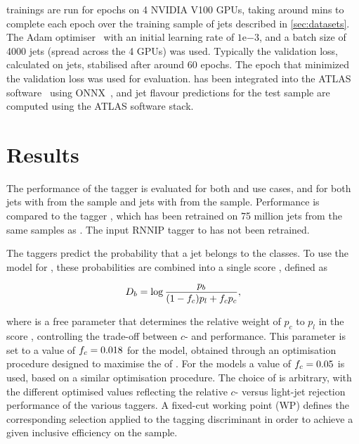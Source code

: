 \GNN trainings are run for \nepochs epochs on 4 NVIDIA V100 GPUs, taking around \minsperepoch mins to complete each epoch over the training sample of \njetstrain jets described in \cref{sec:datasets}.
The Adam optimiser~\cite{arxiv.1412.6980} with an initial learning rate of $1\mathrm{e}{-3}$, and a batch size of 4000 jets (spread across the 4 GPUs) was used.
Typically the validation loss, calculated on \njetsval jets, stabilised after around 60 epochs.
The epoch that minimized the validation loss was used for evaluation.
\GNN has been integrated into the ATLAS software~\cite{ATL-SOFT-PUB-2021-001} using ONNX~\cite{bai2019}, and jet flavour predictions for the test sample are computed using the ATLAS software stack.


\section{Results}\label{sec:gnn_results}


The performance of the \GNN tagger is evaluated for both \btag and \ctag use cases, and for both jets with \ttbarpt from the \ttbar sample and jets with \Zprimept from the \Zprime sample.
Performance is compared to the \DLr tagger \cite{ATL-PHYS-PUB-2017-013}, which has been retrained on 75 million jets from the same samples as \GNN.
The input RNNIP tagger \cite{ATL-PHYS-PUB-2017-003} to \DLr has not been retrained.

The taggers predict the probability that a jet belongs to the \bcl classes. To use the model for \btag, these probabilities are combined into a single score \Db, defined as

\begin{equation}\label{eq:btag-disc}
    \Db = \log{\frac{p_b}{(1-\fc )p_l + \fc  p_c}} ,
\end{equation}

where \fc is a free parameter that determines the relative weight of $p_c$ to $p_l$ in the score \Db, controlling the trade-off between $c$- and \lrej performance.
This parameter is set to a value of $f_c = 0.018$ for the \DLr model, obtained through an optimisation procedure designed to maximise the \clrej of \DLr \cite{ATL-PHYS-PUB-2017-013}.
For the \GNN models a value of $f_c = 0.05$ is used, based on a similar optimisation procedure.
The choice of \fc is arbitrary, with the different optimised values reflecting the relative $c$- versus light-jet rejection performance of the various taggers.
A fixed-cut working point (WP) defines the corresponding selection applied to the tagging discriminant \Db in order to achieve a given inclusive efficiency on the \ttbar sample.

